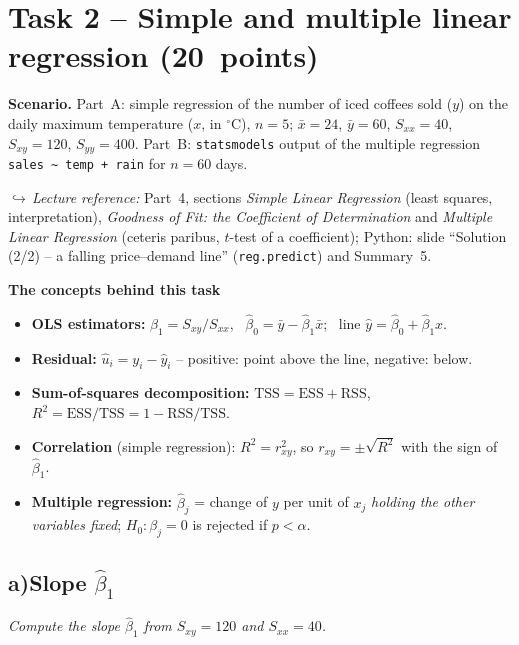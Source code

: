 \documentclass[11pt]{article}
\newcommand{\lectureref}[1]{\noindent\textcolor{black!62}{\small$\hookrightarrow$\,\textit{Lecture reference:} #1}\par\vspace{4pt}}
\begin{document}
\section[Task 2 -- Simple and multiple linear regression]{Task 2 -- Simple and multiple linear regression \hfill\mbox{\normalsize(20 points)}}

\begin{scenariobox}
\textbf{Scenario.} Part~A: simple regression of the number of iced coffees sold ($y$) on the daily
maximum temperature ($x$, in $^{\circ}$C), $n = 5$; $\bar x = 24$, $\bar y = 60$,
$S_{xx} = 40$, $S_{xy} = 120$, $S_{yy} = 400$. Part~B: \texttt{statsmodels} output of the
multiple regression \texttt{sales \textasciitilde{} temp + rain} for $n = 60$ days.
\end{scenariobox}
\lectureref{Part~4, sections \emph{Simple Linear Regression} (least squares,
interpretation), \emph{Goodness of Fit: the Coefficient of Determination} and
\emph{Multiple Linear Regression} (ceteris paribus, $t$-test of a coefficient); Python:
slide ``Solution (2/2) -- a falling price--demand line'' (\texttt{reg.predict}) and Summary~5.}

\begin{conceptbox}
\textbf{The concepts behind this task}
\begin{itemize}[leftmargin=1.3em,itemsep=1.5pt,topsep=3pt]
\item \textbf{OLS estimators:} $\hat\beta_1 = S_{xy}/S_{xx}$, \ $\hat\beta_0 = \bar y - \hat\beta_1\bar x$; \ line $\hat y = \hat\beta_0 + \hat\beta_1 x$.
\item \textbf{Residual:} $\hat u_i = y_i - \hat y_i$ -- positive: point above the line, negative: below.
\item \textbf{Sum-of-squares decomposition:} $\text{TSS} = \text{ESS} + \text{RSS}$, \ $R^2 = \text{ESS}/\text{TSS} = 1 - \text{RSS}/\text{TSS}$.
\item \textbf{Correlation} (simple regression): $R^2 = r_{xy}^2$, so $r_{xy} = \pm\sqrt{R^2}$ with the sign of $\hat\beta_1$.
\item \textbf{Multiple regression:} $\hat\beta_j$ = change of $y$ per unit of $x_j$ \emph{holding the other variables fixed}; $H_0\colon \beta_j = 0$ is rejected if $p < \alpha$.
\end{itemize}
\end{conceptbox}

\subsection*{a)\quad Slope $\hat\beta_1$}
{\noindent\textit{Compute the slope $\hat\beta_1$ from $S_{xy} = 120$ and $S_{xx} = 40$.}\par}\nopagebreak[4]
\end{document}
